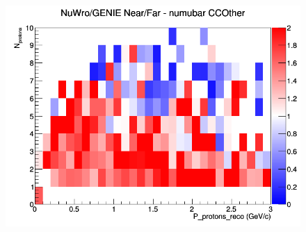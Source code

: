 \documentclass[12pt]{article}
\begin{document}
\begin{figure}[h]
\endminipage
{}
\includegraphics[width=\linewidth]{eff_N_P/FGT/protons/ratios/CCOther_NuWro_GENIE_numubar_NF_N_P.png}
\endminipage
\newline
\end{figure}
\clearpage
\end{document}
